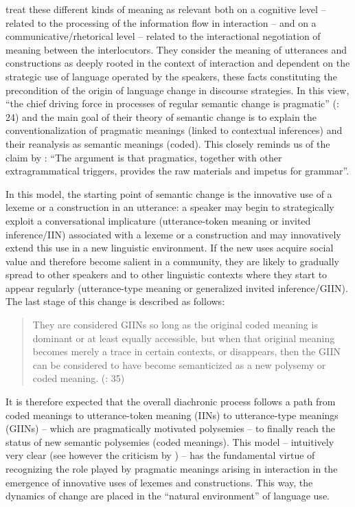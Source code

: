 \citet[24–25]{TraugottDasher2002} treat these different kinds of meaning as relevant both on a cognitive level – related to the processing of the information flow in interaction – and on a communicative/rhetorical level – related to the interactional negotiation of meaning between the interlocutors. They consider the meaning of utterances and constructions as deeply rooted in the context of interaction and dependent on the strategic use of language operated by the speakers, these facts constituting the precondition of the origin of language change in discourse strategies. In this view, “the chief driving force in processes of regular semantic change is pragmatic” (\citealt{TraugottDasher2002}: 24) and the main goal of their theory of semantic change is to explain the conventionalization of pragmatic meanings (linked to contextual inferences) and their reanalysis as semantic meanings (coded). This closely reminds us of the claim by \citet[111]{Ariel2008}: “The argument is that pragmatics, together with other extragrammatical triggers, provides the raw materials and impetus for grammar”.

In this model, the starting point of semantic change is the innovative use of a lexeme or a construction in an utterance: a speaker may begin to strategically exploit a conversational implicature (utterance-token meaning or invited inference/IIN) associated with a lexeme or a construction and may innovatively extend this use in a new linguistic environment. If the new uses acquire social value and therefore become salient in a community, they are likely to gradually spread to other speakers and to other linguistic contexts where they start to appear regularly (utterance-type meaning or generalized invited inference/GIIN). The last stage of this change is described as follows:

\begin{quote}
They are considered GIINs so long as the original coded meaning is dominant or at least equally accessible, but when that original meaning becomes merely a trace in certain contexts, or disappears, then the GIIN can be considered to have become semanticized as a new polysemy or coded meaning. (\citealt{TraugottDasher2002}: 35)
\end{quote}

It is therefore expected that the overall diachronic process follows a path from coded meanings to utterance-token meaning (IINs) to utterance-type meanings (GIINs) – which are pragmatically motivated polysemies – to finally reach the status of new semantic polysemies (coded meanings). This model – intuitively very clear (see however the criticism by \citealt{HansenWaltereit2006}) – has the fundamental virtue of recognizing the role played by pragmatic meanings arising in interaction in the emergence of innovative uses of lexemes and constructions. This way, the dynamics of change are placed in the “natural environment” of language use.

